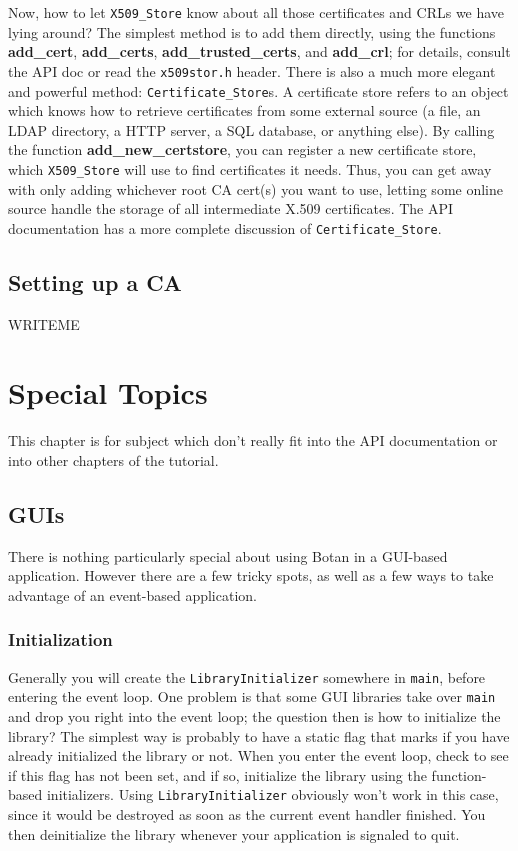 \documentclass{article}
\newcommand{\filename}[1]{\texttt{#1}}
\newcommand{\function}[1]{\textbf{#1}}
\newcommand{\type}[1]{\texttt{#1}}
\begin{document}
Now, how to let \type{X509\_Store} know about all those certificates and CRLs
we have lying around? The simplest method is to add them directly, using the
functions \function{add\_cert}, \function{add\_certs},
\function{add\_trusted\_certs}, and \function{add\_crl}; for details, consult
the API doc or read the \filename{x509stor.h} header. There is also a much more
elegant and powerful method: \type{Certificate\_Store}s. A certificate store
refers to an object which knows how to retrieve certificates from some external
source (a file, an LDAP directory, a HTTP server, a SQL database, or anything
else). By calling the function \function{add\_new\_certstore}, you can register
a new certificate store, which \type{X509\_Store} will use to find certificates
it needs. Thus, you can get away with only adding whichever root CA cert(s) you
want to use, letting some online source handle the storage of all intermediate
X.509 certificates. The API documentation has a more complete discussion of
\type{Certificate\_Store}.

\subsection{Setting up a CA}

WRITEME

\pagebreak

\section{Special Topics}

This chapter is for subject which don't really fit into the API documentation
or into other chapters of the tutorial.

\subsection{GUIs}

There is nothing particularly special about using Botan in a GUI-based
application. However there are a few tricky spots, as well as a few ways to
take advantage of an event-based application.

\subsubsection{Initialization}

Generally you will create the \type{LibraryInitializer} somewhere in
\texttt{main}, before entering the event loop. One problem is that some GUI
libraries take over \texttt{main} and drop you right into the event loop; the
question then is how to initialize the library? The simplest way is probably to
have a static flag that marks if you have already initialized the library or
not. When you enter the event loop, check to see if this flag has not been set,
and if so, initialize the library using the function-based initializers. Using
\type{LibraryInitializer} obviously won't work in this case, since it would be
destroyed as soon as the current event handler finished. You then deinitialize
the library whenever your application is signaled to quit.
\end{document}

